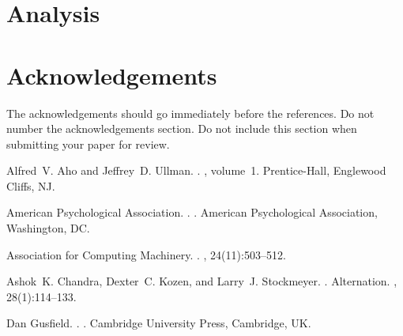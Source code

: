 \documentclass[11pt]{article}
\begin{document}
\section{Analysis}

\section*{Acknowledgements}

The acknowledgements should go immediately before the references.  Do
not number the acknowledgements section. Do not include this section
when submitting your paper for review.

%
%

\begin{thebibliography}{}

Alfred~V. Aho and Jeffrey~D. Ullman.
.
, volume~1.
\newblock Prentice-{Hall}, Englewood Cliffs, NJ.

{American Psychological Association}.
.
.
\newblock American Psychological Association, Washington, DC.

{Association for Computing Machinery}.
.
, 24(11):503--512.

Ashok~K. Chandra, Dexter~C. Kozen, and Larry~J. Stockmeyer.
.
\newblock Alternation.
,
  28(1):114--133.

Dan Gusfield.
.
.
\newblock Cambridge University Press, Cambridge, UK.

\end{thebibliography}
\end{document}
